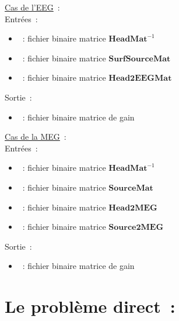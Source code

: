 \checkItem \underline{Cas de l'EEG}~:\\
Entrées~:
\begin{itemize}
    \item {}~: fichier binaire matrice $\mathbf{HeadMat}^{-1}$
    \item {}~: fichier binaire matrice $\mathbf{SurfSourceMat}$
    \item {}~: fichier binaire matrice $\mathbf{Head2EEGMat}$
\end{itemize}
Sortie~:
\begin{itemize}
    \item {}~: fichier binaire matrice de gain
\end{itemize}

\medskip

\noindent
{}


\bigskip

\checkItem\underline{Cas de la MEG}~:\\
Entrées~:
\begin{itemize}
    \item {}~: fichier binaire matrice $\mathbf{HeadMat}^{-1}$
    \item {}~: fichier binaire matrice $\mathbf{SourceMat}$
    \item {}~: fichier binaire matrice $\mathbf{Head2MEG}$
    \item {}~: fichier binaire matrice $\mathbf{Source2MEG}$
\end{itemize}
Sortie~:
\begin{itemize}
    \item {}~: fichier binaire matrice de gain
\end{itemize}

\medskip

\noindent
{}


\section{Le problème direct~:}
\label{sect: command direct}

